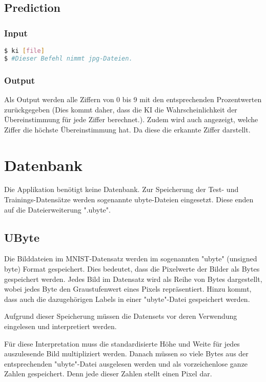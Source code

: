 \subsection{Prediction}
\label{sec:DesignAnwendung}
\subsubsection{Input}
\label{sec:DesignUseInput}
\begin{lstlisting}[language=bash]
$ ki [file]
$ #Dieser Befehl nimmt jpg-Dateien.
\end{lstlisting}

\subsubsection{Output}
\label{sec:DesignUseOutput}
Als Output werden alle Ziffern von 0 bis 9 mit den entsprechenden Prozentwerten zurückgegeben (Dies kommt daher, dass die KI die Wahrscheinlichkeit der Übereinstimmung für jede Ziffer berechnet.). Zudem wird auch angezeigt, welche Ziffer die höchste Übereinstimmung hat. Da diese die erkannte Ziffer darstellt.

\section{Datenbank}
\label{sec:DesignDatenbank}
Die Applikation benötigt keine Datenbank. Zur Speicherung der Test- und Trainings-Datensätze werden sogenannte ubyte-Dateien eingesetzt. Diese enden auf die Dateierweiterung ".ubyte".

\subsection{UByte}
\label{sec:UByte}
Die Bilddateien im MNIST-Datensatz werden im sogenannten "ubyte" (unsigned byte) Format gespeichert. Dies bedeutet, dass die Pixelwerte der Bilder als Bytes gespeichert werden. Jedes Bild im Datensatz wird als Reihe von Bytes dargestellt, wobei jedes Byte den Graustufenwert eines Pixels repräsentiert. Hinzu kommt, dass auch die dazugehörigen Labels in einer "ubyte"-Datei gespeichert werden.

Aufgrund dieser Speicherung müssen die Datensets vor deren Verwendung eingelesen und interpretiert werden. 

Für diese Interpretation muss die standardisierte Höhe und Weite für jedes auszulesende Bild multipliziert werden. Danach müssen so viele Bytes aus der entsprechenden "ubyte"-Datei ausgelesen werden und als vorzeichenlose ganze Zahlen gespeichert. Denn jede dieser Zahlen stellt einen Pixel dar.

